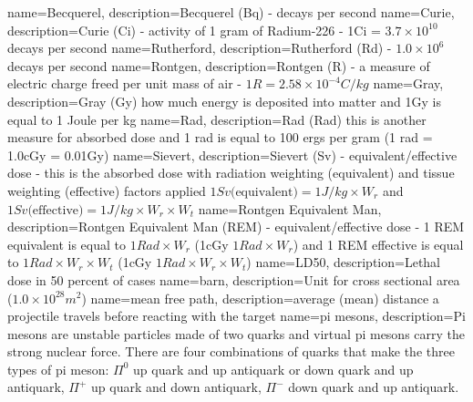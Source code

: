 {
    name=Becquerel,
    description={Becquerel (Bq) - decays per second}
}
{
    name=Curie,
    description={Curie (Ci) - activity of 1 gram of Radium-226 - 1Ci = $3.7 \times 10^{10}$ decays per second}
}
{
    name=Rutherford,
    description={Rutherford (Rd) - $1.0 \times 10^{6}$ decays per second}
}
{
    name=Rontgen,
    description={Rontgen (R) - a measure of electric charge freed per unit mass of air - $1R = 2.58 \times 10^{-4} C/kg$}
}
{
    name=Gray,
    description={Gray (Gy) how much energy is deposited into matter and 1Gy is equal to 1 Joule per kg}
}
{
    name=Rad,
    description={Rad (Rad) this is another measure for absorbed dose and 1 rad is equal to 100 ergs per gram (1 rad = 1.0cGy = 0.01Gy)}
}
{
    name=Sievert,
    description={Sievert (Sv) - equivalent/effective dose - this is the absorbed dose with radiation weighting (equivalent) and tissue weighting (effective) factors applied $1Sv \text{(equivalent)} = 1 J/kg \times W_r$ and $1Sv \text{(effective)} = 1 J/kg \times W_r \times W_t$}
}
{
    name=Rontgen Equivalent Man,
    description={Rontgen Equivalent Man (REM) - equivalent/effective dose - 1 REM equivalent is equal to $1Rad \times W_r$ (1cGy $1Rad \times W_r$) and 1 REM effective is equal to $1Rad \times W_r \times W_t$ (1cGy $1Rad \times W_r \times W_t$)}
}
{
    name=LD50,
    description={Lethal dose in 50 percent of cases}
}
{
    name=barn,
    description={Unit for cross sectional area ($1.0 \times 10^{28} m^{2}$)}
}
{
    name=mean free path,
    description={average (mean) distance a projectile travels before reacting with the target}
}
{
    name=pi mesons,
    description={Pi mesons are unstable particles made of two quarks and virtual pi mesons carry the strong nuclear force.  There are four combinations of quarks that make the three types of pi meson: $\Pi^{0}$ up quark and up antiquark or down quark and up antiquark, $\Pi^{+}$ up quark and down antiquark, $\Pi^{-}$ down quark and up antiquark.}
}


